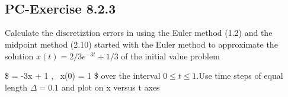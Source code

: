 \documentclass[11pt]{article}
\begin{document}
    \begin{center}
    \end{center}
    { \hspace*{\fill} \\}
    
    \begin{center}
    \end{center}
    { \hspace*{\fill} \\}
    
    \subsection{PC-Exercise 8.2.3}\label{pc-exercise-8.2.3}

Calculate the discretiztion errors in using the Euler method (1.2) and
the midpoint method (2.10) started with the Euler method to approximate
the solution \(x(t) = 2/3 e^{-3t} + 1/3\) of the initial value problem

\$  = -3x + 1 , ~x(0) = 1 \$ over the interval
\(0 \le t \le 1\).Use time steps of equal length \(\Delta = 0.1\) and
plot on x versus t axes
\end{document}
